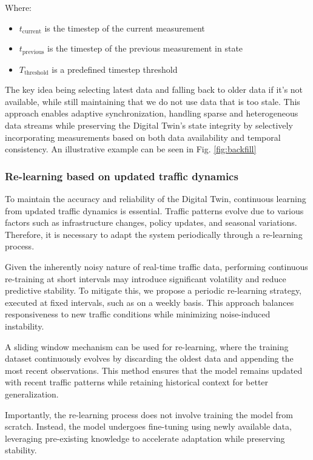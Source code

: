 Where:
\begin{itemize}
    \item $t_{\text{current}}$ is the timestep of the current measurement
    \item $t_{\text{previous}}$ is the timestep of the previous measurement in state
    \item $T_{\text{threshold}}$ is a predefined timestep threshold
\end{itemize}

The key idea being selecting latest data and falling back to older data if it's not available, while still maintaining that we do not use data that is too stale. This approach enables adaptive synchronization, handling sparse and heterogeneous data streams while preserving the Digital Twin's state integrity by selectively incorporating measurements based on both data availability and temporal consistency. An illustrative example can be seen in Fig. \ref{fig:backfill}

\subsubsection{Re-learning based on updated traffic dynamics}\label{subsubsec:sync}

To maintain the accuracy and reliability of the Digital Twin, continuous learning from updated traffic dynamics is essential. Traffic patterns evolve due to various factors such as infrastructure changes, policy updates, and seasonal variations. Therefore, it is necessary to adapt the system periodically through a re-learning process.

Given the inherently noisy nature of real-time traffic data, performing continuous re-training at short intervals may introduce significant volatility and reduce predictive stability. To mitigate this, we propose a periodic re-learning strategy, executed at fixed intervals, such as on a weekly basis. This approach balances responsiveness to new traffic conditions while minimizing noise-induced instability.

A sliding window mechanism can be used for re-learning, where the training dataset continuously evolves by discarding the oldest data and appending the most recent observations. This method ensures that the model remains updated with recent traffic patterns while retaining historical context for better generalization.

Importantly, the re-learning process does not involve training the model from scratch. Instead, the model undergoes fine-tuning using newly available data, leveraging pre-existing knowledge to accelerate adaptation while preserving stability.

